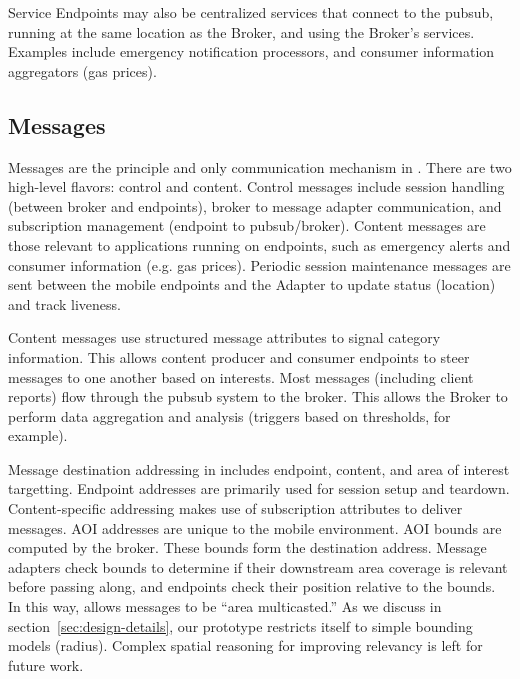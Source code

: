 Service Endpoints may also be centralized services that connect to the
pubsub, running at the same location as the Broker, and using the
Broker's services. Examples include emergency notification processors,
and consumer information aggregators (gas prices).

\subsection{\name{} Messages}

Messages are the principle and only communication mechanism in
\name. There are two high-level flavors: control and
content. Control messages include session handling (between broker and
endpoints), broker to message adapter communication, and subscription
management (endpoint to pubsub/broker).  Content messages are those
relevant to applications running on endpoints, such as emergency
alerts and consumer information (e.g. gas prices).  Periodic session
maintenance messages are sent between the mobile endpoints and the
\name{} Adapter to update status (location) and track liveness.


Content messages use structured 
message attributes to signal category information. This allows content
producer and consumer endpoints to steer messages to one another based
on interests. Most messages (including client reports) flow through
the pubsub system to the broker. This allows the Broker to perform
data aggregation and analysis (triggers based on thresholds, for
example).

Message destination addressing in \name{} includes endpoint, content,
and area of interest targetting. Endpoint addresses are primarily used
for session setup and teardown. Content-specific addressing makes use
of subscription attributes to deliver messages. AOI addresses are
unique to the mobile environment. AOI bounds are computed by the
broker. These bounds form the destination address. Message adapters
check bounds to determine if their downstream area coverage is
relevant before passing along, and endpoints check their position
relative to the bounds.  In this way, \name{} allows messages to be
``area multicasted.''  As we discuss in
section~\ref{sec:design-details}, our prototype restricts itself to
simple bounding models (radius). Complex spatial reasoning for
improving relevancy is left for future work.

